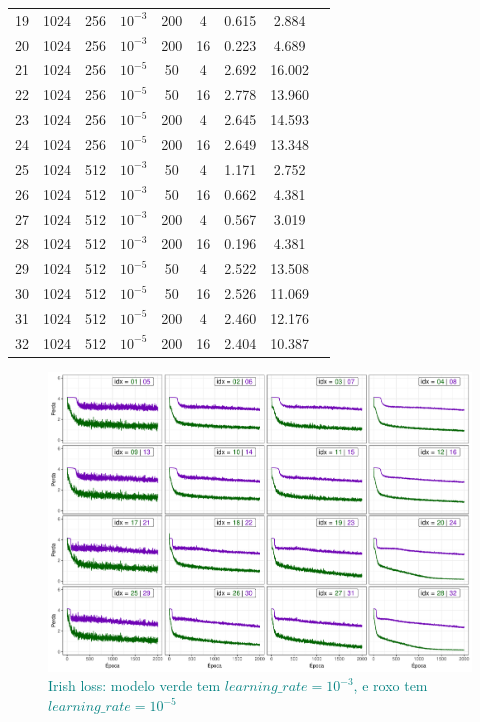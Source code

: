 \documentclass{automatextcc}
\newcommand{\nico}[1]{\textcolor{teal}{#1}}
\begin{document}
\begin{table}
{\begin{tabular}[t]{ccccccccc}
        19 & 1024 & 256 & $10^{-3}$ & 200 & 4 & 0.615 & 2.884 \\
        20 & 1024 & 256 & $10^{-3}$ & 200 & 16 & 0.223 & 4.689 \\
        21 & 1024 & 256 & $10^{-5}$ & 50 & 4 & 2.692 & 16.002 \\
        22 & 1024 & 256 & $10^{-5}$ & 50 & 16 & 2.778 & 13.960 \\
        23 & 1024 & 256 & $10^{-5}$ & 200 & 4 & 2.645 & 14.593 \\
        24 & 1024 & 256 & $10^{-5}$ & 200 & 16 & 2.649 & 13.348 \\
        25 & 1024 & 512 & $10^{-3}$ & 50 & 4 & 1.171 & 2.752 \\
        26 & 1024 & 512 & $10^{-3}$ & 50 & 16 & 0.662 & 4.381 \\
        27 & 1024 & 512 & $10^{-3}$ & 200 & 4 & 0.567 & 3.019 \\
        28 & 1024 & 512 & $10^{-3}$ & 200 & 16 & 0.196 & 4.381 \\
        29 & 1024 & 512 & $10^{-5}$ & 50 & 4 & 2.522 & 13.508 \\
        30 & 1024 & 512 & $10^{-5}$ & 50 & 16 & 2.526 & 11.069 \\
        31 & 1024 & 512 & $10^{-5}$ & 200 & 4 & 2.460 & 12.176 \\
        32 & 1024 & 512 & $10^{-5}$ & 200 & 16 & 2.404 & 10.387 \\
        \bottomrule
        \end{tabular}
    }
\end{table}
\begin{figure}
    \centering
    \includegraphics[width=\textwidth]{irish_tanh_loss.pdf}
    \caption{\nico{Irish loss: modelo verde tem $learning\_rate = 10^{-3}$, e roxo tem $learning\_rate = 10^{-5}$}}\label{fig:irish_tanh_loss}
\end{figure}
\end{document}
